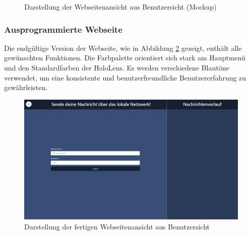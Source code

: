 \begin{itemize}
\begin{figure}[H]
\centering
{}
\caption{Darstellung der Webseitenansicht aus Benutzersicht (Mockup)}
\label{fig:protfrontend}
\end{figure}

\subsubsection*{Ausprogrammierte Webseite}
Die endgültige Version der Webseite, wie in Abbildung \ref{fig:frontend} gezeigt, enthält alle gewünschten Funktionen. Die Farbpalette orientiert sich stark am Hauptmenü und den Standardfarben der HoloLens. Es werden verschiedene Blautöne verwendet, um eine konsistente und benutzerfreundliche Benutzererfahrung zu gewährleisten.

\begin{figure}[H]
\centering
\includegraphics[width=1\textwidth]{images/frontend.png}
\caption{Darstellung der fertigen Webseitenansicht aus Benutzersicht}
\label{fig:frontend}
\end{figure}


\end{itemize}
